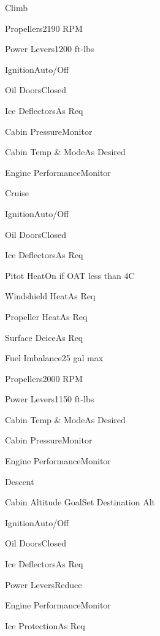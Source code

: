 \documentclass[sim-use]{checklist}
\begin{document}
\begin{checklist}{Climb}
  \item{Propellers}{2190 RPM}
  \item{Power Levers}{1200 ft-lbs}
  \item{Ignition}{Auto/Off}
  \item{Oil Doors}{Closed}
  \item{Ice Deflectors}{As Req}
  \item{Cabin Pressure}{Monitor}
  \item{Cabin Temp \& Mode}{As Desired}
  \item{Engine Performance}{Monitor}
\end{checklist}

\begin{checklist}{Cruise}
  \item{Ignition}{Auto/Off}
  \item{Oil Doors}{Closed}
  \item{Ice Deflectors}{As Req}
  \item{Pitot Heat}{On if OAT less than 4C}
  \item{Windshield Heat}{As Req}
  \item{Propeller Heat}{As Req}
  \item{Surface Deice}{As Req}
  \item{Fuel Imbalance}{25 gal max}
\end{checklist}
\begin{checklist}{}  
  \item{Propellers}{2000 RPM}
  \item{Power Levers}{1150 ft-lbs}
  \item{Cabin Temp \& Mode}{As Desired}
  \item{Cabin Pressure}{Monitor}
  \item{Engine Performance}{Monitor}
\end{checklist}

\begin{checklist}{Descent}
  \item{Cabin Altitude Goal}{Set Destination Alt}
  \item{Ignition}{Auto/Off}
  \item{Oil Doors}{Closed}
  \item{Ice Deflectors}{As Req}
  \item{Power Levers}{Reduce}
  \item{Engine Performance}{Monitor}
  \item{Ice Protection}{As Req}
\end{checklist}
\end{document}
